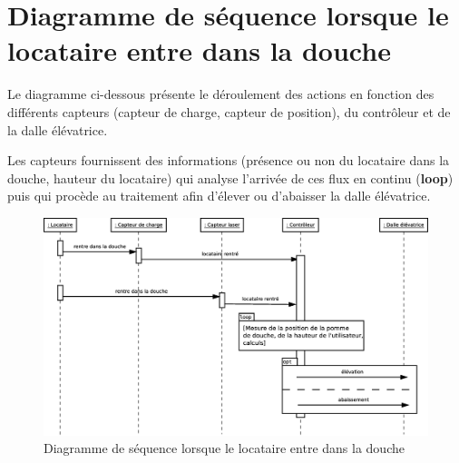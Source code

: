 \section{Diagramme de séquence lorsque le locataire entre dans la douche}
Le diagramme ci-dessous présente le déroulement des actions en fonction des différents capteurs (capteur de charge, capteur de position), du contrôleur et de la dalle élévatrice. 

Les capteurs fournissent des informations (présence ou non du locataire dans la douche, hauteur du locataire) qui analyse l'arrivée de ces flux en continu (\textbf{loop}) puis qui procède au traitement afin d'élever ou d'abaisser la dalle élévatrice. 
\begin{figure}[H]
	\centering
	\includegraphics[width=1\linewidth]{diagrams/bathroom/diagramme_sequence2.eps}
	\caption{Diagramme de séquence lorsque le locataire entre dans la douche}
	\label{fig:diagramme_seq2}
\end{figure}
